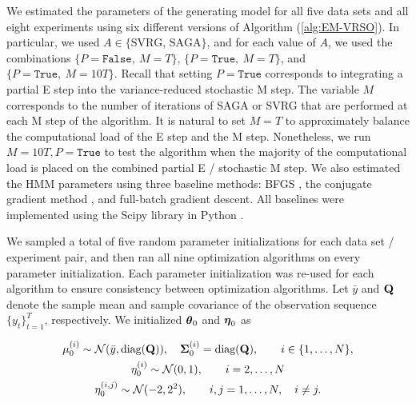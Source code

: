 We estimated the parameters of the generating model for all five data sets and all eight experiments using six different versions of Algorithm (\ref{alg:EM-VRSO}). In particular, we used $A \in \{\text{SVRG, SAGA}\}$, and for each value of $A$, we used the combinations $\{P = \texttt{False}, ~ M = T\}$, $\{P = \texttt{True}, ~ M = T\}$, and $\{P = \texttt{True}, ~ M = 10T\}$. Recall that setting $P = \texttt{True}$ corresponds to integrating a partial E step into the variance-reduced stochastic M step. The variable $M$ corresponds to the number of iterations of SAGA or SVRG that are performed at each M step of the algorithm. It is natural to set $M=T$ to approximately balance the computational load of the E step and the M step. Nonetheless, we run $M=10T, P = \texttt{True}$ to test the algorithm when the majority of the computational load is placed on the combined partial E / stochastic M step. We also estimated the HMM parameters using three baseline methods: BFGS \citep{Fletcher:2000}, the conjugate gradient method \citep{Fletcher:1964}, and full-batch gradient descent. All baselines were implemented using the Scipy library in Python \citep{Virtanen:2019}.

We sampled a total of five random parameter initializations for each data set / experiment pair, and then ran all nine optimization algorithms on every parameter initialization. Each parameter initialization was re-used for each algorithm to ensure consistency between optimization algorithms. Let $\bar y$ and $\mathbf{Q}$ denote the sample mean and sample covariance of the observation sequence $\{y_t\}_{t=1}^T$, respectively. We initialized $\boldsymbol{\theta}_0$ and $\boldsymbol{\eta}_0$ as

\begin{gather*}
    \mu^{(i)}_0 \sim \mathcal{N}(\bar y, \text{diag}(\mathbf{Q})), \quad \boldsymbol{\Sigma}^{(i)}_0 = \text{diag}(\mathbf{Q}), \qquad i \in \{1,\ldots,N\}, \\
    \eta^{(i)}_0 \sim \mathcal{N}(0,1), \qquad i = 2,\ldots,N \\
    \eta^{(i,j)}_0 \sim \mathcal{N}(-2,2^2), \qquad i,j = 1,\ldots,N, \quad i \neq j.
\end{gather*}
%

